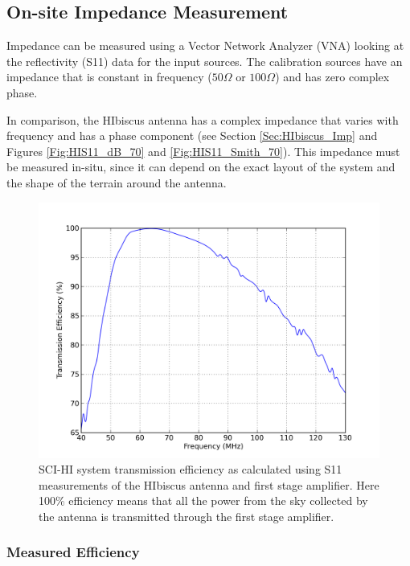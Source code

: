 \subsection{On-site Impedance Measurement}

Impedance can be measured using a Vector Network Analyzer (VNA) looking at the reflectivity (S11) data for the input sources. The calibration sources have an impedance that is constant in frequency ($50 \Omega$ or $100 \Omega$) and has zero complex phase.

In comparison, the HIbiscus antenna has a complex impedance that varies with frequency and has a phase component (see Section \ref{Sec:HIbiscus_Imp} and Figures \ref{Fig:HIS11_dB_70} and \ref{Fig:HIS11_Smith_70}). This impedance must be measured in-situ, since it can depend on the exact layout of the system and the shape of the terrain around the antenna. 

\begin{figure}[htb]
\begin{center}
\includegraphics[width=0.9\linewidth]{Data_analysis/figures/old_ant_efficiency.png}
\caption{SCI-HI system transmission efficiency as calculated using S11 measurements of the HIbiscus antenna and first stage amplifier. Here 100\% efficiency means that all the power from the sky collected by the antenna is transmitted through the first stage amplifier. }
\label{Fig:eff}
\end{center}
\end{figure}

\subsubsection{Measured Efficiency}

